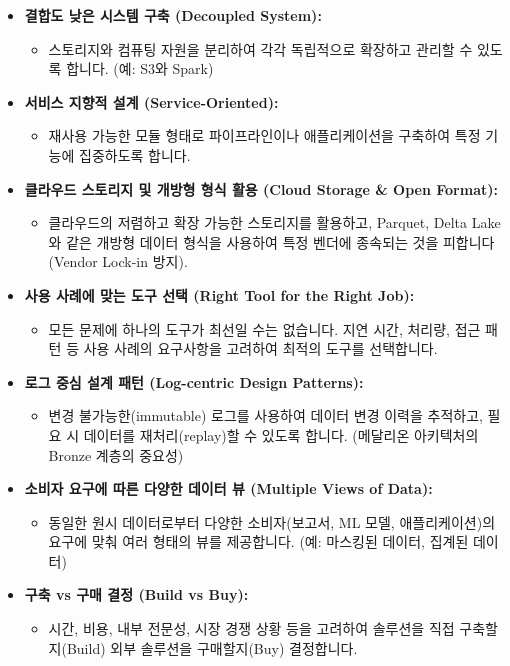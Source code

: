 \documentclass[11pt,a4paper]{article}
\theoremstyle{definition}
\begin{document}
\begin{itemize}
    \item \textbf{결합도 낮은 시스템 구축 (Decoupled System):}
    \begin{itemize}
        \item 스토리지와 컴퓨팅 자원을 분리하여 각각 독립적으로 확장하고 관리할 수 있도록 합니다. (예: S3와 Spark)
    \end{itemize}
    \item \textbf{서비스 지향적 설계 (Service-Oriented):}
    \begin{itemize}
        \item 재사용 가능한 모듈 형태로 파이프라인이나 애플리케이션을 구축하여 특정 기능에 집중하도록 합니다.
    \end{itemize}
    \item \textbf{클라우드 스토리지 및 개방형 형식 활용 (Cloud Storage & Open Format):}
    \begin{itemize}
        \item 클라우드의 저렴하고 확장 가능한 스토리지를 활용하고, Parquet, Delta Lake와 같은 개방형 데이터 형식을 사용하여 특정 벤더에 종속되는 것을 피합니다 (Vendor Lock-in 방지).
    \end{itemize}
    \item \textbf{사용 사례에 맞는 도구 선택 (Right Tool for the Right Job):}
    \begin{itemize}
        \item 모든 문제에 하나의 도구가 최선일 수는 없습니다. 지연 시간, 처리량, 접근 패턴 등 사용 사례의 요구사항을 고려하여 최적의 도구를 선택합니다.
    \end{itemize}
    \item \textbf{로그 중심 설계 패턴 (Log-centric Design Patterns):}
    \begin{itemize}
        \item 변경 불가능한(immutable) 로그를 사용하여 데이터 변경 이력을 추적하고, 필요 시 데이터를 재처리(replay)할 수 있도록 합니다. (메달리온 아키텍처의 Bronze 계층의 중요성)
    \end{itemize}
    \item \textbf{소비자 요구에 따른 다양한 데이터 뷰 (Multiple Views of Data):}
    \begin{itemize}
        \item 동일한 원시 데이터로부터 다양한 소비자(보고서, ML 모델, 애플리케이션)의 요구에 맞춰 여러 형태의 뷰를 제공합니다. (예: 마스킹된 데이터, 집계된 데이터)
    \end{itemize}
    \item \textbf{구축 vs 구매 결정 (Build vs Buy):}
    \begin{itemize}
        \item 시간, 비용, 내부 전문성, 시장 경쟁 상황 등을 고려하여 솔루션을 직접 구축할지(Build) 외부 솔루션을 구매할지(Buy) 결정합니다.
    \end{itemize}
\end{itemize}
\end{document}
